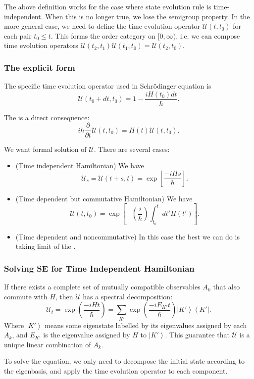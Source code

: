 The above definition works for the case where state evolution rule is time-independent. When this is no longer true, we lose the semigroup property. In the more general case, we need to define the time evolution operator $\mathcal{U}(t, t_0)$ for each pair $t_0 \le  t$. This forms the order category on $[0,\infty )$, i.e. we can compose time evolution operators $\mathcal{U}(t_2, t_1) \mathcal{U}(t_1, t_0) = \mathcal{U}(t_2, t_0)$.

\subsubsection{The explicit form}

The specific time evolution operator used in Schr\"odinger equation is
\[
	\mathcal{U}(t_0 + dt, t_0) = 1 - \frac{i H(t_0) dt }{\hbar}
.\] 

The  is a direct consequence:
\[
	i \hbar \frac{\partial }{\partial t} \mathcal{U}(t, t_0)
	= H(t) \mathcal{U}(t, t_0)
.\] 

We want formal solution of $\mathcal{U}$. There are several cases:
\begin{itemize}
	\item (Time independent Hamiltonian) We have
		\[
			\mathcal{U}_s = \mathcal{U}(t+s, t) 
			= \exp \left[ \frac{- i H s}{\hbar} \right] 
		.\] 
	\item (Time dependent but commutative Hamiltonian) We have
		\[
			\mathcal{U}(t, t_0) = \exp \left[ - \left( \frac{i}{\hbar}  \right) \int _{t_0}^t dt' H(t') \right] 
		.\] 
	\item (Time dependent and noncommutative) In this case the best we can do is taking limit of the .
\end{itemize}

\subsubsection{Solving SE for Time Independent Hamiltonian}

If there exists a complete set of mutually compatible observables $A_k$ that also commute with $H$, then $\mathcal{U}$ has a spectral decomposition:
\[
	\mathcal{U}_{t} = \exp\left( \frac{- i H t}{\hbar} \right) 
	= \sum_{K'} \exp\left( \frac{- i E_{K'} t}{\hbar} \right) \left| K' \right\rangle \left\langle K' \right| 
.\] 
Where $\left| K' \right\rangle$ means some eigenstate labelled by its eigenvalues assigned by each $A_k$, and $E_{K'}$ is the eigenvalue assigned by $H$ to $\left| K' \right\rangle $.
This guarantee that $\mathcal{U}$ is a unique linear combination of $A_k$.

To solve the equation, we only need to decompose the initial state according to the eigenbasis, and apply the time evolution operator to each component.

